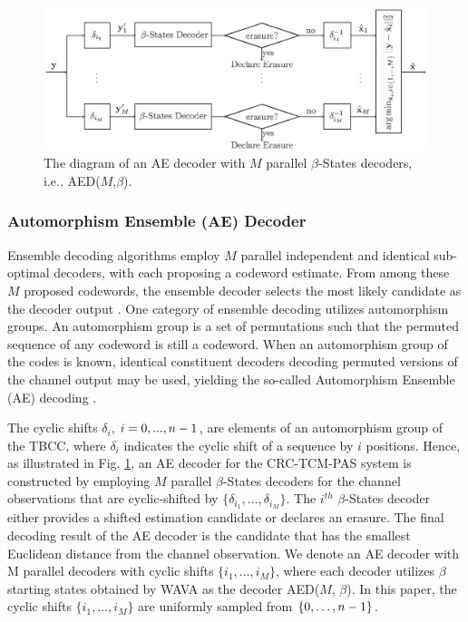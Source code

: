 \documentclass [PhD] {uclathes}
\begin{document}
\begin{figure}[t] 
    \centering
      \includegraphics[width=1\linewidth]{figures/AED_structure_2.eps}
      \caption{The diagram of an AE decoder with $M$ parallel $\beta$-States decoders, i.e., AED($M$,$\beta$). }
      \label{fig: AED_str}
\end{figure}

\subsubsection{Automorphism Ensemble (AE) Decoder}
Ensemble decoding algorithms \cite{geiselhart2022automorphism} employ $M$ parallel independent and identical sub-optimal decoders, with each proposing a codeword estimate.  From among these $M$ proposed codewords, the ensemble decoder selects the most likely candidate as the decoder output \cite{geiselhart2022automorphism}. One category of ensemble decoding utilizes automorphism groups. An automorphism group is a set of permutations such that the permuted sequence of any codeword is still a codeword.  When an automorphism group of the codes is known, identical constituent decoders decoding permuted versions of the channel output may be used, yielding the so-called Automorphism Ensemble (AE) decoding \cite{geiselhart2022automorphism}. 
 
The cyclic shifts $\delta_i$, $i=0,...,n-1$, are elements of an automorphism group of the TBCC, where  $\delta_i$ indicates the cyclic shift of a sequence by $i$ positions. Hence, as illustrated in Fig. \ref{fig: AED_str}, an AE decoder for the CRC-TCM-PAS system is constructed by employing $M$ parallel $\beta$-States decoders for the channel observations that are cyclic-shifted by  $\{\delta_{i_1},\ldots,\delta_{i_M}\}$. The $i^{th}$ $\beta$-States decoder either provides a shifted estimation candidate or declares an erasure. The final decoding result of the AE decoder is the candidate that has the smallest Euclidean distance from the channel observation. We denote an AE decoder with M parallel decoders with cyclic  shifts $\{{i_1},\ldots,{i_M}\}$, where each decoder utilizes $\beta$ starting states obtained by WAVA as the decoder AED($M$, $\beta$). In this paper, the cyclic shifts  $\{{i_1},\ldots,{i_M}\}$ are uniformly sampled from $\{0,\ldots,n-1\}$. 
\end{document}
